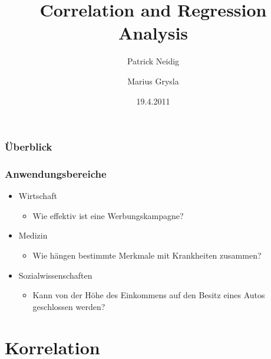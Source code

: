\documentclass{beamer}
\begin{document}
\title{Correlation and Regression Analysis}
\author{Patrick Neidig \and Marius Grysla}
\date{19.4.2011}
\frame{\titlepage}

\begin{frame}
 \frametitle{\"Uberblick}
 \tableofcontents
\end{frame}

\begin{frame}
 \frametitle{Anwendungsbereiche}

 \begin{itemize}
  \item Wirtschaft
  \begin{itemize}
   \item Wie effektiv ist eine Werbungskampagne?
  \end{itemize}

  \item Medizin
  \begin{itemize}
   \item Wie h\"angen bestimmte Merkmale mit Krankheiten zusammen?
  \end{itemize}

  \item Sozialwissenschaften
  \begin{itemize}
   \item Kann von der H\"ohe des Einkommens auf den Besitz eines Autos geschlossen werden?
  \end{itemize}


 \end{itemize}

\end{frame}


\section{Korrelation}
\end{document}
